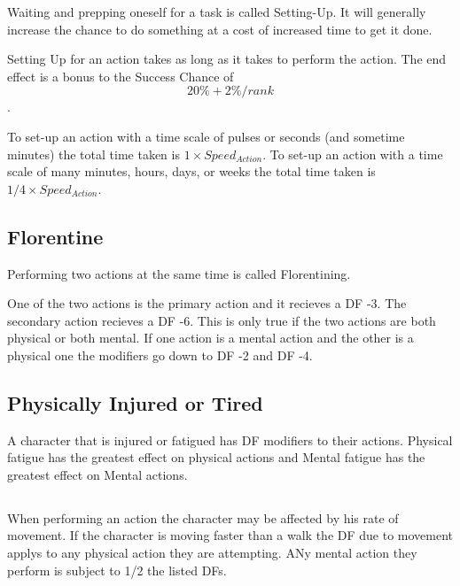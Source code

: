 Waiting and prepping oneself for a task is called Setting-Up. It will generally increase 
the chance to do something at a cost of increased time to get it done.

Setting Up for an action takes as long as it takes to perform the action. The end effect is a
bonus to the Success Chance of \[ 20\% + 2\%/rank\]. 

To set-up an action with a time scale of pulses or seconds (and sometime minutes) the total time taken is \( 1 \times Speed_{Action} \).
To set-up an action with a time scale of many minutes, hours, days, or weeks the total time taken is \( 1/4 \times Speed_{Action} \).  

\subsection{Florentine}

Performing two actions at the same time is called Florentining.

One of the two actions is the primary action and it recieves a 
DF -3. The secondary action recieves a DF -6. This is only true 
if the two actions are both physical or both mental. If one 
action is a mental action and the other is a physical one the modifiers
go down to DF -2 and DF -4.



\subsection{Physically Injured or Tired}

A character that is injured or fatigued has DF modifiers to 
their actions. Physical fatigue has the greatest effect on physical actions 
and Mental fatigue has the greatest effect on Mental actions.




\subsection{}

When performing an action the character may be affected by 
his rate of movement. If the character is moving faster than a 
walk the DF due to movement applys to any physical action they are 
attempting. ANy mental action they perform is subject to 1/2 
the listed DFs.


